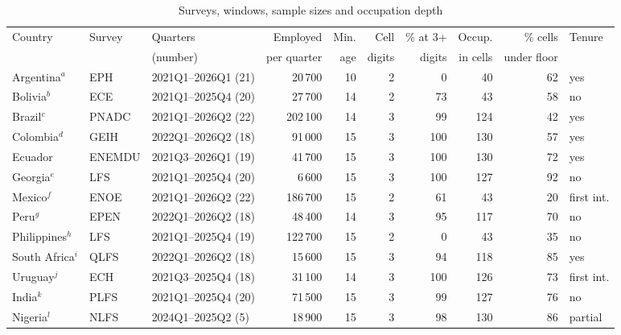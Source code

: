 \begin{table}[htbp]
\centering
\scriptsize
\setlength{\tabcolsep}{4pt}
\begin{threeparttable}
\caption{Surveys, windows, sample sizes and occupation depth}
\label{tab:surveys}
\begin{tabular}{lllrrrrrrl}
\toprule
Country & Survey & Quarters & Employed & Min. & Cell & \% at 3+ & Occup. & \% cells & Tenure \\
 &  & (number) & per quarter & age & digits & digits & in cells & under floor &  \\
\midrule
Argentina$^{a}$ & EPH & 2021Q1--2026Q1 (21) & 20\,700 & 10 & 2 & 0 & 40 & 62 & yes \\
Bolivia$^{b}$ & ECE & 2021Q1--2025Q4 (20) & 27\,700 & 14 & 2 & 73 & 43 & 58 & no \\
Brazil$^{c}$ & PNADC & 2021Q1--2026Q2 (22) & 202\,100 & 14 & 3 & 99 & 124 & 42 & yes \\
Colombia$^{d}$ & GEIH & 2022Q1--2026Q2 (18) & 91\,000 & 15 & 3 & 100 & 130 & 57 & yes \\
Ecuador & ENEMDU & 2021Q3--2026Q1 (19) & 41\,700 & 15 & 3 & 100 & 130 & 72 & yes \\
Georgia$^{e}$ & LFS & 2021Q1--2025Q4 (20) & 6\,600 & 15 & 3 & 100 & 127 & 92 & no \\
Mexico$^{f}$ & ENOE & 2021Q1--2026Q2 (22) & 186\,700 & 15 & 2 & 61 & 43 & 20 & first int. \\
Peru$^{g}$ & EPEN & 2022Q1--2026Q2 (18) & 48\,400 & 14 & 3 & 95 & 117 & 70 & no \\
Philippines$^{h}$ & LFS & 2021Q1--2025Q4 (19) & 122\,700 & 15 & 2 & 0 & 43 & 35 & no \\
South Africa$^{i}$ & QLFS & 2022Q1--2026Q2 (18) & 15\,600 & 15 & 3 & 94 & 118 & 85 & yes \\
Uruguay$^{j}$ & ECH & 2021Q3--2025Q4 (18) & 31\,100 & 14 & 3 & 100 & 126 & 73 & first int. \\
\midrule
India$^{k}$ & PLFS & 2021Q1--2025Q4 (20) & 71\,500 & 15 & 3 & 99 & 127 & 76 & no \\
Nigeria$^{l}$ & NLFS & 2024Q1--2025Q2 (5) & 18\,900 & 15 & 3 & 98 & 130 & 86 & partial \\
\bottomrule
\end{tabular}
\begin{tablenotes}[flushleft]
\footnotesize

\end{tablenotes}
\end{threeparttable}
\end{table}
